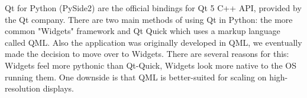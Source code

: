 Qt for Python (PySide2) are the official bindings for Qt 5 C++ API, provided by the Qt company. There are two main methods of using Qt in Python: the more common "Widgets" framework and Qt Quick which uses a markup language called QML.
Also the application was originally developed in QML, we eventually made the decision to move over to Widgets. There are several reasons for this: Widgets feel more pythonic than Qt-Quick, Widgets look more native to the OS running them. One downside is that QML is better-suited for scaling on high-resolution displays.
\bigskip



